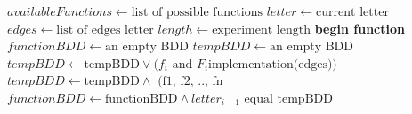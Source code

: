\documentclass{article}      %
\newcounter{ct}
\begin{document}
\begin{algorithm}
\begin{algorithmic}[1]
\State $availableFunctions \gets \text{list of possible functions}$
\State $letter \gets \text{current letter}$
\State $edges \gets \text{list of edges letter}$
\State $length \gets \text{experiment length}$
\State \textbf{begin function}
\State $functionBDD \gets \text{an empty BDD}$
        \State $tempBDD \gets \text{an empty BDD}$
            \State $tempBDD \gets \text{tempBDD} \vee  \text{($f_i$ and $F_i$implementation(edges))}$
            \State {}
        \EndFor
        \State $tempBDD \gets \text{tempBDD} \wedge \text{ (f1, f2, .., fn}$
        \State {}
        \State $functionBDD \gets \text{functionBDD} \wedge \text{$letter_{i+1}$ equal tempBDD}$
    \EndFor
    \State {}
\EndFunction
\end{algorithmic}
\end{algorithm}
\end{document}

